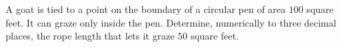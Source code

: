 A goat is tied to a point on the boundary of a circular pen of area $100$ square feet. It can graze only inside the pen. Determine, numerically to three decimal places, the rope length that lets it graze $50$ square feet.
